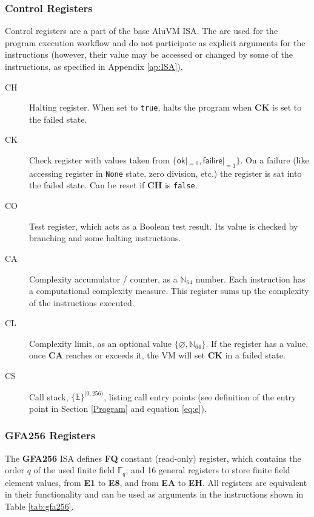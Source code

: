 \documentclass[9pt,oneside]{amsart}
\begin{document}
\begin{multicols}{2}
\subsubsection{Control Registers}\label{Registers}

Control registers are a part of the base AluVM ISA.
The are used for the program execution workflow and do not participate
as explicit arguments for the instructions (however, their value may be accessed or changed
by some of the instructions, as specified in Appendix \ref{ap:ISA}).

\begin{description}
\item[CH] Halting register. When set to \texttt{true},
    halts the program when \textbf{CK} is set to the failed state.
\item[CK] Check register with values taken from $\{\mathsf{ok}|_{=0}, \mathsf{failire}|_{=1}\}$.
    On a failure (like accessing register in \texttt{None} state,
    zero division, etc.) the register is sat into the failed state.
    Can be reset if \textbf{CH} is \texttt{false}.
\item[CO] Test register, which acts as a Boolean test result.
    Its value is checked by branching and some halting instructions.
\item[CA] Complexity accumulator / counter, as a $\mathbb{N}_{64}$ number.
    Each instruction has a computational complexity measure.
    This register sums up the complexity of the instructions executed.
\item[CL] Complexity limit, as an optional value $\{\varnothing, \mathbb{N}_{64}\}$.
    If the register has a value, once \textbf{CA} reaches or exceeds it,
    the VM will set \textbf{CK} in a failed state.
\item[CS] Call stack, $\{ \mathbb{E} \}^{[0, 256)}$, listing call entry points
    (see definition of the entry point in Section \ref{Program} and equation \ref{eq:e}).
\end{description}

\subsubsection{\textbf{GFA256} Registers}

The \textbf{GFA256} ISA defines \textbf{FQ} constant (read-only) register,
which contains the order $q$ of the used finite field $\mathbb{F}_q$; and
16 general registers to store finite field element values,
from \textbf{E1} to \textbf{E8}, and from \textbf{EA} to \textbf{EH}.
All registers are equivalent in their functionality and can be used
as arguments in the instructions shown in Table \ref{tab:gfa256}.


\end{multicols}
\end{document}
